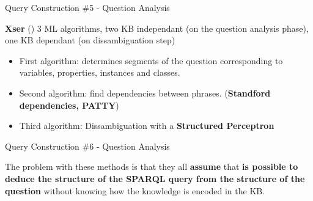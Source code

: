 \documentclass{beamer}
\begin{document}

\begin{frame}{Query Construction \#5 - Question Analysis}
  \begin{card}
    \textbf{Xser} (\cite{xu2014a}) 3 ML algorithms, two KB independant (on the question analysis phase), one KB dependant (on dissambiguation step)
    \begin{itemize}
      \item First algorithm: determines segments of the question corresponding to variables, properties, instances and classes.
      \item Second algorithm: find dependencies between phrases. (\textbf{Standford dependencies, PATTY})
      \item Third algorithm: Dissambiguation with a \textbf{Structured Perceptron} 
    \end{itemize}
  \end{card}
\end{frame}

\note{}

\begin{frame}{Query Construction \#6 - Question Analysis}
  \begin{card}
    The problem with these methods is that they all \textbf{assume} that \textbf{is possible to deduce the structure of the SPARQL query from the structure of the question} without knowing how the knowledge is encoded in the KB\@.
  \end{card}
\end{frame}

\note{}
\end{document}
